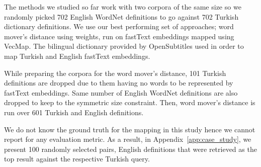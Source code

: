 The methods we studied so far work with two corpora of the same size so we randomly picked 702 English WordNet definitions to go against 702 Turkish dictionary definitions.
We use our best performing set of approaches; word mover's distance using \tfidf{} weights, run on fastText embeddings mapped using VecMap.
The bilingual dictionary provided by OpenSubtitles used in order to map Turkish and English fastText embeddings.

While preparing the corpora for the word mover's distance, 101 Turkish definitions are dropped due to them having no words to be represented by fastText embeddings.
Same number of English WordNet definitions are also dropped to keep to the symmetric size constraint.
Then, word mover's distance is run over 601 Turkish and English definitions.

We do not know the ground truth for the mapping in this study hence we cannot report for any evaluation metric.
As a result, in Appendix~\ref{app:case_study}, we present 100 randomly selected pairs, English definitions that were retrieved as the top result against the respective Turkish query.
